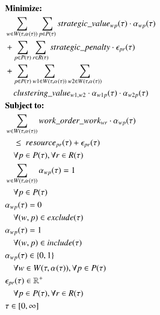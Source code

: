 \begin{alignat}{2}
	& \textbf{Minimize:} \notag\\
	& \sum_{w \in W(\tau, \alpha_{}(\tau))} \sum_{p \in P(\tau)} strategic\_value_{wp}(\tau) \cdot \alpha_{wp}(\tau)                                                                                      \\ 
	& + \sum_{p \in P(\tau)} \sum_{r \in R(\tau)} strategic\_penalty \cdot \epsilon_{pr}(\tau)                                                                                                                                  \\
	& + \sum_{p \in P(\tau)} \sum_{w1 \in W(\tau, \alpha_{}(\tau))} \sum_{w2 \in W(\tau, \alpha_{}(\tau))} \notag\\ 
	& \quad clustering\_value_{w1, w2} \cdot \alpha_{w1p}(\tau) \cdot \alpha_{w2p}(\tau)                                                                                 \label{eqn:objective_function_strategic} \\
	& \textbf{Subject to:} \notag                                                                                                                                                                                      \\
	& \sum_{w \in W(\tau, \alpha_{}(\tau))} work\_order\_work_{wr} \cdot \alpha_{wp}(\tau) \notag \\ 
	& \quad \leq \ resource_{pr}(\tau) + \epsilon_{pr}(\tau) \notag                                                                       \\ 
	& \quad \forall p \in P(\tau), \forall r \in R(\tau)                                                                                                                  \label{eqn:capacity_constraint}          \\
	& \sum_{w \in W(\tau, \alpha_{}(\tau))} \alpha_{wp}(\tau) = 1 \notag\\
	& \quad \forall p \in P(\tau)                      \label{eqn:single_workorder_constraint}  \\
	& \alpha_{wp}(\tau) = 0 \notag\\
	& \quad \forall (w, p) \in exclude(\tau)                          \label{eqn:exclusion_constraint}  \\
	& \alpha_{wp}(\tau) = 1 \notag\\ 
	& \quad \forall (w, p) \in include(\tau)                          \label{eqn:inclusion_constraint}  \\
	& \alpha_{wp}(\tau) \in \{0, 1\} \notag\\
	& \quad \forall w \in W(\tau, \alpha_{}(\tau)), \forall p \in P(\tau)     \label{eqn:x_integrality_constraint}     \\ 
	& \epsilon_{pr}(\tau) \in \mathbb{R}^{+} \notag\\ 
	& \quad \forall p \in P(\tau), \forall r \in R(\tau)                           \label{eqn:p_non_negativity_constraint}  \\ 
	& \tau \in  [0, \infty] 
\end{alignat}
